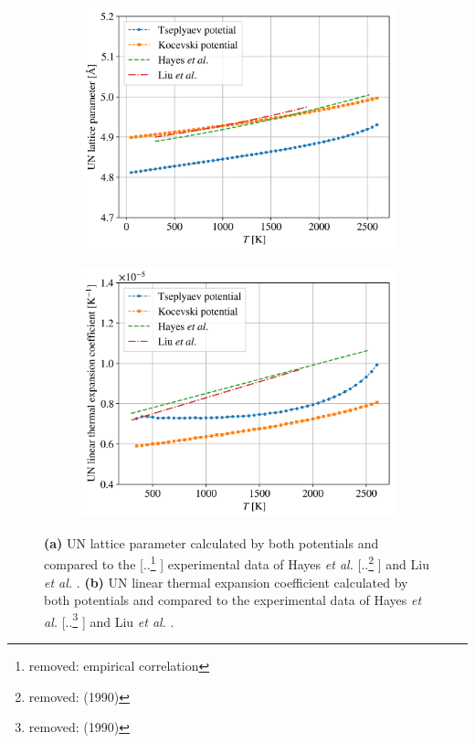 \documentclass[preprint, 12pt]{elsarticle}
\providecommand{\DIFaddtex}[1]{{\protect\color{blue} \sf #1}} %
\providecommand{\DIFdeltex}[1]{{\protect\color{red} [..\footnote{removed: #1} ]}} %
\providecommand{\DIFaddFL}[1]{\DIFadd{#1}} %
\providecommand{\DIFdelFL}[1]{\DIFdel{#1}} %
\providecommand{\DIFaddbeginFL}{} %
\providecommand{\DIFaddendFL}{} %
\providecommand{\DIFdelbeginFL}{} %
\providecommand{\DIFdelendFL}{} %
\providecommand{\DIFadd}[1]{\texorpdfstring{\DIFaddtex{#1}}{#1}} %
\providecommand{\DIFdel}[1]{\texorpdfstring{\DIFdeltex{#1}}{}} %
\newcommand{\DIFscaledelfig}{0.5}
\newlength{\DIFdelgraphicswidth} %
\newlength{\DIFdelgraphicsheight} %
\newcommand{\DIFaddincludegraphics}[2][]{{\color{blue}\fbox{\DIFOincludegraphics[#1]{#2}}}} %
\newcommand{\DIFdelincludegraphics}[2][]{%
\sbox{\DIFdelgraphicsbox}{\DIFOincludegraphics[#1]{#2}}%
\settoboxwidth{\DIFdelgraphicswidth}{\DIFdelgraphicsbox} %
\settoboxtotalheight{\DIFdelgraphicsheight}{\DIFdelgraphicsbox} %
\scalebox{\DIFscaledelfig}{%
\parbox[b]{\DIFdelgraphicswidth}{\usebox{\DIFdelgraphicsbox}\\[-\baselineskip] \rule{\DIFdelgraphicswidth}{0em}}\llap{\resizebox{\DIFdelgraphicswidth}{\DIFdelgraphicsheight}{%
\setlength{\unitlength}{\DIFdelgraphicswidth}%
\begin{picture}(1,1)%
\thicklines\linethickness{2pt} %
{\color[rgb]{1,0,0}\put(0,0){\framebox(1,1){}}}%
{\color[rgb]{1,0,0}\put(0,0){\line( 1,1){1}}}%
{\color[rgb]{1,0,0}\put(0,1){\line(1,-1){1}}}%
\end{picture}%
}\hspace*{3pt}}} %
} %
\DeclareRobustCommand{\DIFaddbeginFL}{\DIFOaddbeginFL \let\includegraphics\DIFaddincludegraphics} %
\DeclareRobustCommand{\DIFaddendFL}{\DIFOaddendFL \let\includegraphics\DIFOincludegraphics} %
\DeclareRobustCommand{\DIFdelbeginFL}{\DIFOdelbeginFL \let\includegraphics\DIFdelincludegraphics} %
\DeclareRobustCommand{\DIFdelendFL}{\DIFOaddendFL \let\includegraphics\DIFOincludegraphics} %
\begin{document}
\begin{figure}[h!]
\captionsetup{width=\textwidth}
\centering
\begin{subfigure}{0.4\textwidth}
    \includegraphics[width=\textwidth]{UNL.png}
    \caption{}
    \label{Fig:UNL}
\end{subfigure}
\begin{subfigure}{0.4\textwidth}
    \includegraphics[width=\textwidth]{UNLTEC.png}
    \caption{}
    \label{Fig:UNLTEC}
\end{subfigure}
\caption{\textbf{(a)} UN lattice parameter calculated by both potentials and compared to the \DIFdelbeginFL \DIFdelFL{empirical correlation }\DIFdelendFL \DIFaddbeginFL \DIFaddFL{experimental data }\DIFaddendFL of Hayes \textit{et al.} \DIFdelbeginFL \DIFdelFL{(1990) }\DIFdelendFL \cite{Hayes1990I} \DIFaddbeginFL \DIFaddFL{and Liu \textit{et al.} \cite{Liu2023}}\DIFaddendFL . \textbf{(b)} UN linear thermal expansion coefficient calculated by both potentials and compared to the experimental data of Hayes \textit{et al.} \DIFdelbeginFL \DIFdelFL{(1990) }\DIFdelendFL \cite{Hayes1990I} \DIFaddbeginFL \DIFaddFL{and Liu \textit{et al.} \cite{Liu2023}}\DIFaddendFL .}
\label{Fig:UNL-LTEC}
\end{figure}
\end{document}
